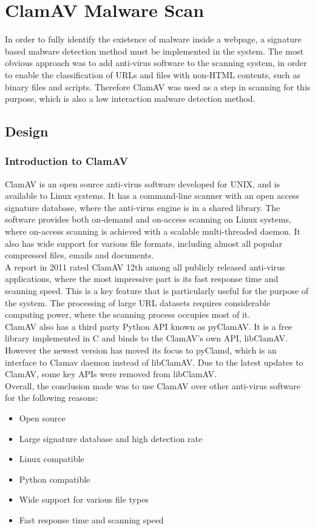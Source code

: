 
\section{ClamAV Malware Scan}
In order to fully identify the existence of malware inside a webpage, a 
signature based malware detection method must be implemented in the system. 
The most obvious approach was to add anti-virus software to the scanning system, 
in order to enable the classification of URLs and files with non-HTML contents, such 
as binary files and scripts. Therefore ClamAV was used as a step in scanning for this purpose, which is also a low interaction malware detection 
method.

\subsection{Design}
\subsubsection{Introduction to ClamAV}
ClamAV is an open source anti-virus software developed for UNIX, and is 
available to Linux systems. It has a command-line scanner with an open access 
signature database, where the anti-virus engine is in a shared library. 
The software provides both on-demand and on-access scanning on Linux systems, 
where on-access scanning is achieved with a scalable multi-threaded daemon. 
It also has wide support for various file formats, including almost all 
popular compressed files, emails and documents. \\
A report in 2011 rated ClamAV 12th among all publicly released anti-virus 
applications,\cite{shandowserver} where the most impressive part is its fast 
response time and scanning speed. This is a key feature that is particularly useful for the purpose of the system. The processing of large URL
datasets requires considerable computing power, where the scanning process 
occupies most of it. \\
ClamAV also has a third party Python API known as pyClamAV. It is a free 
library implemented in C and binds to the ClamAV's own API, libClamAV. However 
the newest version has moved its focus to pyClamd, which is an interface to Clamav 
daemon instead of libClamAV. Due to the latest updates to ClamAV, some 
key APIs were removed from libClamAV. \\
Overall, the conclusion made was to use ClamAV over other 
anti-virus software for the following reasons: 
\begin{itemize}
\item Open source
\item Large signature database and high detection rate
\item Linux compatible
\item Python compatible
\item Wide support for various file types
\item Fast response time and scanning speed
\end{itemize}

